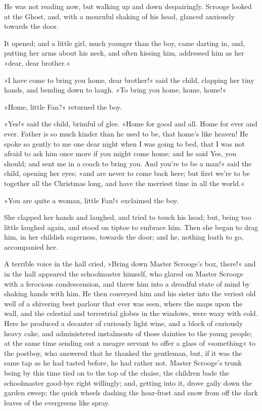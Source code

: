 He was not reading now, but walking up and down despairingly. Scrooge looked at the Ghost, and, with a mournful shaking of his head, glanced anxiously towards the door.

It opened; and a little girl, much younger than the boy, came darting in, and, putting her arms about his neck, and often kissing him, addressed him as her »dear, dear brother.«

»I have come to bring you home, dear brother!« said the child, clapping her tiny hands, and bending down to laugh. »To bring you home, home, home!«

»Home, little Fan?« returned the boy.

»Yes!« said the child, brimful of glee. »Home for good and all. Home for ever and ever. Father is so much kinder than he used to be, that home's like heaven! He spoke so gently to me one dear night when I was going to bed, that I was not afraid to ask him once more if you might come home; and he said Yes, you should; and sent me in a coach to bring you. And you're to be a man!« said the child, opening her eyes; »and are never to come back here; but first we're to be together all the Christmas long, and have the merriest time in all the world.«

»You are quite a woman, little Fan!« exclaimed the boy.

She clapped her hands and laughed, and tried to touch his head; but, being too little laughed again, and stood on tiptoe to embrace him. Then she began to drag him, in her childish eagerness, towards the door; and he, nothing loath to go, accompanied her.

A terrible voice in the hall cried, »Bring down Master Scrooge's box, there!« and in the hall appeared the schoolmaster himself, who glared on Master Scrooge with a ferocious condescension, and threw him into a dreadful state of mind by shaking hands with him. He then conveyed him and his sister into the veriest old well of a shivering best parlour that ever was seen, where the maps upon the wall, and the celestial and terrestrial globes in the windows, were waxy with cold. Here he produced a decanter of curiously light wine, and a block of curiously heavy cake, and administered instalments of those dainties to the young people; at the same time sending out a meagre servant to offer a glass of »something« to the postboy, who answered that he thanked the gentleman, but, if it was the same tap as he had tasted before, he had rather not. Master Scrooge's trunk being by this time tied on to the top of the chaise, the children bade the schoolmaster good-bye right willingly; and, getting into it, drove gaily down the garden sweep; the quick wheels dashing the hoar-frost and snow from off the dark leaves of the evergreens like spray.

